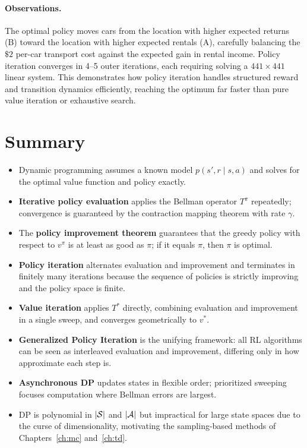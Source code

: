 \paragraph{Observations.}
The optimal policy moves cars from the location with higher expected returns (B) toward the location with higher expected rentals (A), carefully balancing the $\$2$ per-car transport cost against the expected gain in rental income.  Policy iteration converges in 4--5 outer iterations, each requiring solving a $441 \times 441$ linear system.  This demonstrates how policy iteration handles structured reward and transition dynamics efficiently, reaching the optimum far faster than pure value iteration or exhaustive search.

\section{Summary}
\label{sec:dp-summary}

\begin{itemize}[leftmargin=*]
\item Dynamic programming assumes a known model $p(s',r \mid s,a)$ and solves for the optimal value function and policy exactly.
\item \textbf{Iterative policy evaluation} applies the Bellman operator $T^\pi$ repeatedly; convergence is guaranteed by the contraction mapping theorem with rate $\gamma$.
\item The \textbf{policy improvement theorem} guarantees that the greedy policy with respect to $v^\pi$ is at least as good as $\pi$; if it equals $\pi$, then $\pi$ is optimal.
\item \textbf{Policy iteration} alternates evaluation and improvement and terminates in finitely many iterations because the sequence of policies is strictly improving and the policy space is finite.
\item \textbf{Value iteration} applies $T^*$ directly, combining evaluation and improvement in a single sweep, and converges geometrically to $v^*$.
\item \textbf{Generalized Policy Iteration} is the unifying framework: all RL algorithms can be seen as interleaved evaluation and improvement, differing only in how approximate each step is.
\item \textbf{Asynchronous DP} updates states in flexible order; prioritized sweeping focuses computation where Bellman errors are largest.
\item DP is polynomial in $|\mathcal{S}|$ and $|\mathcal{A}|$ but impractical for large state spaces due to the curse of dimensionality, motivating the sampling-based methods of Chapters~\ref{ch:mc} and~\ref{ch:td}.
\end{itemize}

